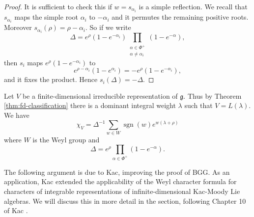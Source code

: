 \documentclass[12pt]{article}
\begin{document}
\begin{proof}
    It is sufficient to check this if $w = s_{\alpha_i}$ is a simple reflection. We recall that
    $s_{\alpha_i}$ maps the simple root $\alpha_i$ to $-\alpha_i$ and it permutes the remaining
    positive roots. Moreover $s_{\alpha_i}(\rho) = \rho - \alpha_i$. So if we write
    \[
        \Delta = e^\rho (1 - e^{-\alpha_i}) \prod_{\substack{\alpha \in \Phi^+ \\ \alpha \neq \alpha_i}}
        (1 - e^{-\alpha}),
    \]
    then $s_i$ maps $e^\rho (1 - e^{-\alpha_i})$ to
    \[
        e^{\rho-\alpha_i}(1 - e^{\alpha_i}) = - e^\rho (1 - e^{-\alpha_i}),
    \]
    and it fixes the product. Hence $s_i(\Delta) = -\Delta$.
\end{proof}

\begin{theorem}
    Let $V$ be a finite-dimensional irreducible representation of $\mathfrak{g}$. Thus by Theorem \ref{thm:fd-classification} there is a dominant integral weight $\lambda$ such that $V = L(\lambda)$. We have
    \[
        \chi_V = \Delta^{-1} \sum_{w \in W} \operatorname{sgn}(w) e^{w(\lambda + \rho)}
    \]
    where $W$ is the Weyl group and
    \[
        \Delta = e^{\rho} \prod_{\alpha \in \Phi^+} (1 - e^{-\alpha}).
    \]
\end{theorem}

The following argument is due to Kac, improving the proof of BGG.  As an application, Kac extended the applicability of the Weyl character formula for characters of integrable representations of infinite-dimensional Kac-Moody Lie algebras. We will discuss this in more detail in the section, following Chapter 10 of Kac \cite{kac}.
\end{document}
